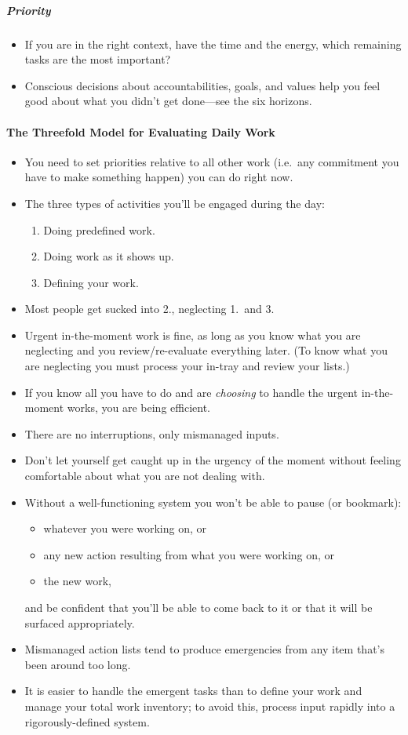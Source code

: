 \documentclass{article}
\begin{document}
\subparagraph{Priority}

\begin{itemize}
 \item If you are in the right context, have the time and the energy, which remaining tasks are the most important?
 \item Conscious decisions about accountabilities, goals, and values help you feel good about what you didn't get done---see the six horizons.
\end{itemize}

\paragraph{The Threefold Model for Evaluating Daily Work}

\begin{itemize}
 \item You need to set priorities relative to all other work (i.e.\ any commitment you have to make something happen) you can do right now.
 \item The three types of activities you'll be engaged during the day:
 \begin{enumerate}
   \item Doing predefined work.
   \item Doing work as it shows up.
   \item Defining your work.
 \end{enumerate}
 \item Most people get sucked into 2., neglecting 1.\ and 3.
 \item Urgent in-the-moment work is fine, as long as you know what you are neglecting and you review/re-evaluate everything later. (To know what you are neglecting you must process your in-tray and review your lists.)
 \item If you know all you have to do and are \emph{choosing} to handle the urgent in-the-moment works, you are being efficient.
 \item There are no interruptions, only mismanaged inputs.
 \item Don't let yourself get caught up in the urgency of the moment without feeling comfortable about what you are not dealing with.
 \item Without a well-functioning system you won't be able to pause (or bookmark):
 \begin{itemize}
  \item whatever you were working on, or
  \item any new action resulting from what you were working on, or
  \item the new work,
 \end{itemize}
 and be confident that you'll be able to come back to it or that it will be surfaced appropriately.
 \item Mismanaged action lists tend to produce emergencies from any item that's been around too long.
 \item It is easier to handle the emergent tasks than to define your work and manage your total work inventory; to avoid this, process input rapidly into a rigorously-defined system.
\end{itemize}
\end{document}
